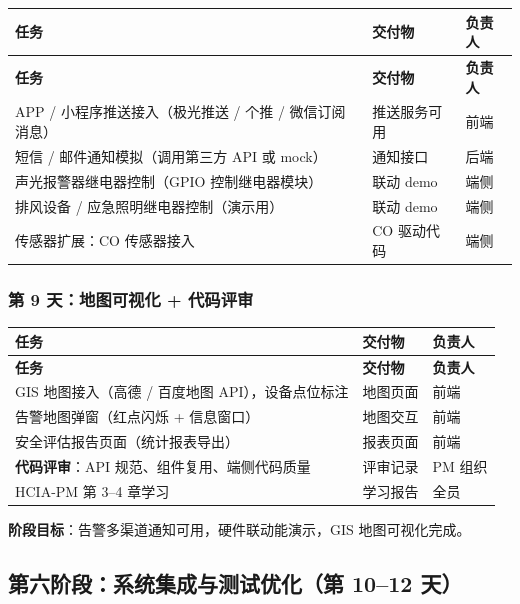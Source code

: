 \documentclass[UTF8,12pt,a4paper]{ctexart}
\begin{document}
\begin{longtable}{L{6cm}L{4.5cm}C{2.5cm}}
\toprule
\textbf{任务} & \textbf{交付物} & \textbf{负责人} \\
\midrule
\endfirsthead
\toprule
\textbf{任务} & \textbf{交付物} & \textbf{负责人} \\
\midrule
\endhead
\bottomrule
\endfoot

APP / 小程序推送接入（极光推送 / 个推 / 微信订阅消息） & 推送服务可用 & 前端 \\
\midrule
短信 / 邮件通知模拟（调用第三方 API 或 mock） & 通知接口 & 后端 \\
\midrule
声光报警器继电器控制（GPIO 控制继电器模块） & 联动 demo & 端侧 \\
\midrule
排风设备 / 应急照明继电器控制（演示用） & 联动 demo & 端侧 \\
\midrule
传感器扩展：CO 传感器接入 & CO 驱动代码 & 端侧 \\
\bottomrule
\end{longtable}

\subsubsection{第 9 天：地图可视化 + 代码评审}

\begin{longtable}{L{6cm}L{4.5cm}C{2.5cm}}
\toprule
\textbf{任务} & \textbf{交付物} & \textbf{负责人} \\
\midrule
\endfirsthead
\toprule
\textbf{任务} & \textbf{交付物} & \textbf{负责人} \\
\midrule
\endhead
\bottomrule
\endfoot

GIS 地图接入（高德 / 百度地图 API），设备点位标注 & 地图页面 & 前端 \\
\midrule
告警地图弹窗（红点闪烁 + 信息窗口） & 地图交互 & 前端 \\
\midrule
安全评估报告页面（统计报表导出） & 报表页面 & 前端 \\
\midrule
\textbf{代码评审}：API 规范、组件复用、端侧代码质量 & 评审记录 & PM 组织 \\
\midrule
HCIA-PM 第 3--4 章学习 & 学习报告 & 全员 \\
\bottomrule
\end{longtable}

\textbf{阶段目标}：告警多渠道通知可用，硬件联动能演示，GIS 地图可视化完成。

\subsection{第六阶段：系统集成与测试优化（第 10--12 天）}
\end{document}
